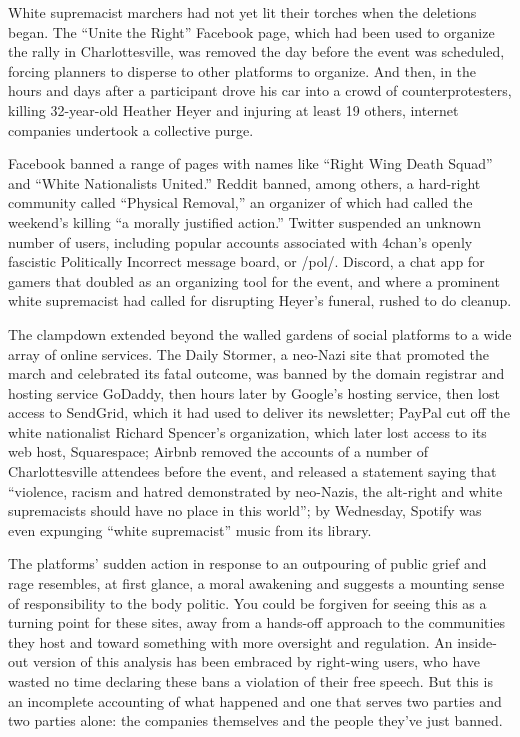 White supremacist marchers had not yet lit their torches when the
deletions began. The ``Unite the Right'' Facebook page, which had been
used to organize the rally in Charlottesville, was removed the day
before the event was scheduled, forcing planners to disperse to other
platforms to organize. And then, in the hours and days after a
participant drove his car into a crowd of counterprotesters, killing
32-year-old Heather Heyer and injuring at least 19 others, internet
companies undertook a collective purge.

Facebook banned a range of pages with names like ``Right Wing Death
Squad'' and ``White Nationalists United.'' Reddit banned, among others,
a hard-right community called ``Physical Removal,'' an organizer of
which had called the weekend's killing ``a morally justified action.''
Twitter suspended an unknown number of users, including popular accounts
associated with 4chan's openly fascistic Politically Incorrect message
board, or /pol/. Discord, a chat app for gamers that doubled as an
organizing tool for the event, and where a prominent white supremacist
had called for disrupting Heyer's funeral, rushed to do cleanup.

The clampdown extended beyond the walled gardens of social platforms to
a wide array of online services. The Daily Stormer, a neo-Nazi site that
promoted the march and celebrated its fatal outcome, was banned by the
domain registrar and hosting service GoDaddy, then hours later by
Google's hosting service, then lost access to SendGrid, which it had
used to deliver its newsletter; PayPal cut off the white nationalist
Richard Spencer's organization, which later lost access to its web host,
Squarespace; Airbnb removed the accounts of a number of Charlottesville
attendees before the event, and released a statement saying that
``violence, racism and hatred demonstrated by neo-­Nazis, the alt-right
and white supremacists should have no place in this world''; by
Wednesday, Spotify was even expunging ``white supremacist'' music from
its library.

The platforms' sudden action in response to an outpouring of public
grief and rage resembles, at first glance, a moral awakening and
suggests a mounting sense of responsibility to the body politic. You
could be forgiven for seeing this as a turning point for these sites,
away from a hands-off approach to the communities they host and toward
something with more oversight and regulation. An inside-out version of
this analysis has been embraced by right-wing users, who have wasted no
time declaring these bans a violation of their free speech. But this is
an incomplete accounting of what happened and one that serves two
parties and two parties alone: the companies themselves and the people
they've just banned.

